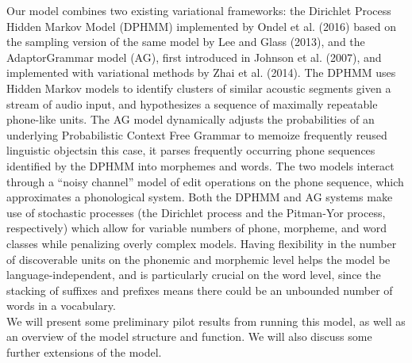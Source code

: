 \documentclass[12pt,letterpaper]{article}
\newcommand\tab[1][1cm]{\hspace*{#1}}
\newif\ifcomments
\newcommand{\cm}[1]{\textcolor{purple}{\ifcomments[COMMENT: #1]\else\fi}}
\begin{document}
\tab Our model combines two existing variational frameworks\cm{say ``builds on'' rather than ``combines'' and ``earlier'' rather than ``existing''}: the Dirichlet Process Hidden Markov Model (DPHMM) implemented by Ondel et al. (2016) based on the sampling version of the same model by Lee and Glass (2013), and the AdaptorGrammar model (AG), first introduced in Johnson et al. (2007), and implemented with variational methods by Zhai et al. (2014). The DPHMM uses Hidden Markov models to identify clusters of similar acoustic segments given a stream of audio input, and hypothesizes a sequence of maximally repeatable phone-like units.\cm{This is not exactly an accurate description of the DPHMM model, I would describe it at a higher level, like say what it does rather than how.} The AG model dynamically adjusts the probabilities of an underlying Probabilistic Context Free Grammar\cm{not exactly. again, avoid CFG and the term memoize, and describe what it does---learning to store frequently reused units.} to memoize frequently reused linguistic objects\textemdash in this case,\cm{don't mix the description of the old models and the new work like this, say them separately.} it parses frequently occurring phone sequences identified by the DPHMM into morphemes and words. The two models interact through a ``noisy channel''\cm{if this is a first mention, use italics,  avoid quotes (especially scare quotes, they are annoying to many readers).} model of edit operations on the phone sequence, which approximates a phonological system. Both the DPHMM and AG systems make use of stochastic processes (the Dirichlet process and the Pitman-Yor process, respectively) which allow for variable numbers of phone, morpheme, and word classes while penalizing overly complex models.\cm{well, the PYP and DP are really basically the same thing. Again, describe on a higher level ``bayesian nonparametrics''} Having flexibility in the number of discoverable units on the phonemic and morphemic level helps the model be language-independent, and is particularly crucial on the word level, since the stacking of suffixes and prefixes means there could be an unbounded number of words in a vocabulary.\cm{You can end this more strongly by saying instead that the model is able to acquire the full stack of linguistic units in a fully unsupervised, language-independent way. You also need to say significantly more about the novel contribution---building on this earlier work we develop a VB inference algorithm, which has thesesuch and such advantages.} \\
\tab We will present some preliminary pilot results from running this model, as well as an overview of the model structure and function. We will also discuss some further extensions of the model.\cm{I need to think a little about what to say now about results....}
\end{document}
